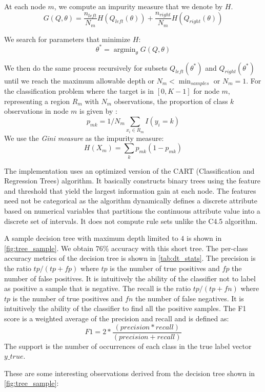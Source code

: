 At each node $m$, we compute an impurity measure that we denote by $H$.
$$G(Q,\theta) = \frac{n_{left}}{N_m} H(Q_{left}(\theta)) +
\frac{n_{right}}{N_m} H(Q_{right}(\theta))$$

We search for parameters that minimize $H$:
$$\theta^* = \operatorname{argmin}_\theta G(Q,\theta)$$

We then do the same process recursively for subsets $Q_{left}(\theta^*)$ and
$Q_{right}(\theta^*)$ until we reach the maximum allowable depth or $N_m
< \min_{samples}$ or $N_m = 1$.
For the classification problem where the target is in $[ 0, K-1]$
for node $m$, representing a region $R_m$ with $N_m$ observations, 
the proportion of class $k$ observations in node $m$ is given by :
$$p_{mk} = 1/ N_m \sum_{x_i \in R_m} I(y_i = k)$$
We use the \textit{Gini measure} as the impurity measure:
$$H(X_m) = \sum_k p_{mk} (1 - p_{mk})$$

The implementation uses an optimized version of the CART (Classification and
Regression Trees) algorithm\citep{cart84}.
It basically constructs binary trees using the feature and threshold that
yield the largest information gain at each node.
The features need not be categorical as the algorithm dynamically 
defines a discrete attribute based on numerical variables that 
partitions the continuous attribute value into a discrete set of intervals. 
It does not compute rule sets unlike the C4.5 algorithm\citep{quinlan93}.

A sample decision tree with maximum depth limited to $4$ is shown in
\cref{fig:tree_sample}. We obtain $76\%$ accuracy with this short tree.
The per-class accuracy metrics of the decision tree is shown in 
\cref{tab:dt_stats}.
The precision is the ratio $tp/(tp+fp)$ where $tp$ is the number of true
positives and $fp$ the number of false positives. 
It is intuitively the ability of the classifier not to label 
as positive a sample that is negative.
The recall is the ratio $tp/(tp+fn)$ where $tp$ is the number of true
positives and $fn$ the number of false negatives. It is intuitively the
ability of the classifier to find all the positive samples.
The F1 score is a weighted average of the precision and recall 
and is defined as:
$$F1 = 2 * \frac{(precision * recall)}{(precision + recall)}$$
The support is the number of occurrences of each class in the true label
vector $y\_true$.

These are some interesting observations derived from the decision tree shown in 
\cref{fig:tree_sample}:\\

